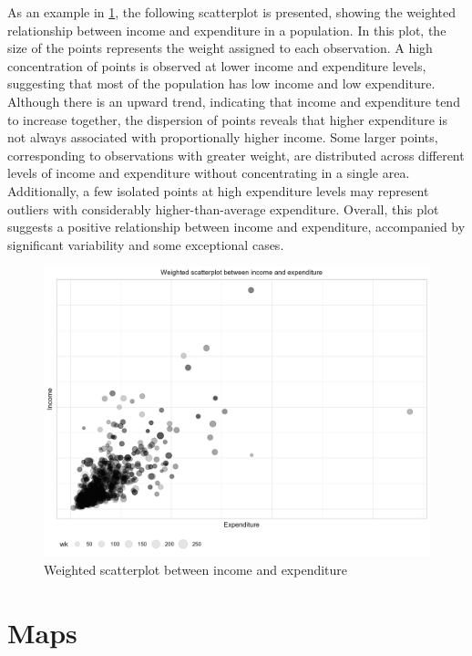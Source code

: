 \documentclass[
  12pt,
]{book}
\begin{document}
As an example in \ref{fig:ScatterIncome}, the following scatterplot is presented, showing the weighted relationship between income and expenditure in a population. In this plot, the size of the points represents the weight assigned to each observation. A high concentration of points is observed at lower income and expenditure levels, suggesting that most of the population has low income and low expenditure. Although there is an upward trend, indicating that income and expenditure tend to increase together, the dispersion of points reveals that higher expenditure is not always associated with proportionally higher income. Some larger points, corresponding to observations with greater weight, are distributed across different levels of income and expenditure without concentrating in a single area. Additionally, a few isolated points at high expenditure levels may represent outliers with considerably higher-than-average expenditure. Overall, this plot suggests a positive relationship between income and expenditure, accompanied by significant variability and some exceptional cases.

\begin{figure}
\includegraphics[width=33.33in]{www/05_graficas/02_scatterplot_ingreso_gasto} \caption{Weighted scatterplot between income and expenditure}\label{fig:ScatterIncome}
\end{figure}

\section{Maps}\label{maps}
\end{document}
